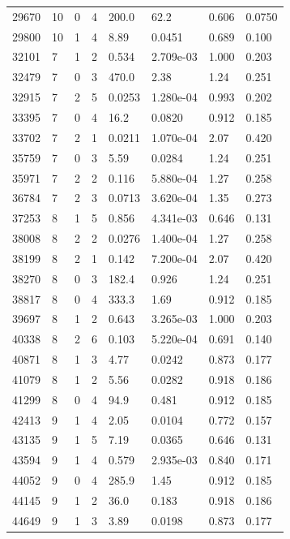 \documentclass[preview]{standalone}
\begin{document}
{{\begin{tabular}{L{1.2cm}C{1.2cm} C{0.3cm}C{0.5cm} C{1.4cm}C{1.4cm} C{1.4cm}C{1.4cm}}
  29670  &    10  & 0     &  4 &  200.0  & 62.2  & 0.606 &  0.0750   \\ 
  29800  &    10  & 1     &  4 &  8.89  & 0.0451  & 0.689 &  0.100   \\ 
  32101  &     7  & 1     &  2 &  0.534  & 2.709e-03  & 1.000 &  0.203   \\ 
  32479  &     7  & 0     &  3 &  470.0  & 2.38  & 1.24 &  0.251   \\ 
  32915  &     7  & 2     &  5 &  0.0253  & 1.280e-04  & 0.993 &  0.202   \\ 
  33395  &     7  & 0     &  4 &  16.2  & 0.0820  & 0.912 &  0.185   \\ 
  33702  &     7  & 2     &  1 &  0.0211  & 1.070e-04  & 2.07 &  0.420   \\ 
  35759  &     7  & 0     &  3 &  5.59  & 0.0284  & 1.24 &  0.251   \\ 
  35971  &     7  & 2     &  2 &  0.116  & 5.880e-04  & 1.27 &  0.258   \\ 
  36784  &     7  & 2     &  3 &  0.0713  & 3.620e-04  & 1.35 &  0.273   \\ 
  37253  &     8  & 1     &  5 &  0.856  & 4.341e-03  & 0.646 &  0.131   \\ 
  38008  &     8  & 2     &  2 &  0.0276  & 1.400e-04  & 1.27 &  0.258   \\ 
  38199  &     8  & 2     &  1 &  0.142  & 7.200e-04  & 2.07 &  0.420   \\ 
  38270  &     8  & 0     &  3 &  182.4  & 0.926  & 1.24 &  0.251   \\ 
  38817  &     8  & 0     &  4 &  333.3  & 1.69  & 0.912 &  0.185   \\ 
  39697  &     8  & 1     &  2 &  0.643  & 3.265e-03  & 1.000 &  0.203   \\ 
  40338  &     8  & 2     &  6 &  0.103  & 5.220e-04  & 0.691 &  0.140   \\ 
  40871  &     8  & 1     &  3 &  4.77  & 0.0242  & 0.873 &  0.177   \\ 
  41079  &     8  & 1     &  2 &  5.56  & 0.0282  & 0.918 &  0.186   \\ 
  41299  &     8  & 0     &  4 &  94.9  & 0.481  & 0.912 &  0.185   \\ 
  42413  &     9  & 1     &  4 &  2.05  & 0.0104  & 0.772 &  0.157   \\ 
  43135  &     9  & 1     &  5 &  7.19  & 0.0365  & 0.646 &  0.131   \\ 
  43594  &     9  & 1     &  4 &  0.579  & 2.935e-03  & 0.840 &  0.171   \\ 
  44052  &     9  & 0     &  4 &  285.9  & 1.45  & 0.912 &  0.185   \\ 
  44145  &     9  & 1     &  2 &  36.0  & 0.183  & 0.918 &  0.186   \\ 
  44649  &     9  & 1     &  3 &  3.89  & 0.0198  & 0.873 &  0.177   \\ 
\hline 
\end{tabular} 

}}
\end{document}
